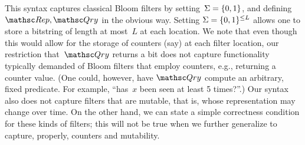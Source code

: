 This syntax captures classical Bloom filters by setting~$\Sigma=\{0,1\}$,  and defining $\Rep,\Qry$ in the obvious way.  Setting $\Sigma=\{0,1\}^{\leq L}$ allows one to store a bitstring of length at most~$L$ at each location.   We note that even though this would allow for the storage of counters (say) at each filter location, our restriction that~$\Qry$ returns a bit does not capture functionality typically demanded of Bloom filters that employ counters, e.g., returning a counter value. (One could, however, have $\Qry$ compute an arbitrary, fixed predicate.  For example, ``has~$x$ been seen at least 5 times?''.)  
Our syntax also does not capture filters that are mutable, that is, whose representation may change over time. 
On the other hand, we can state a simple correctness condition for these kinds of filters; this will not be true when we further generalize to capture, properly, counters and mutability.

  


